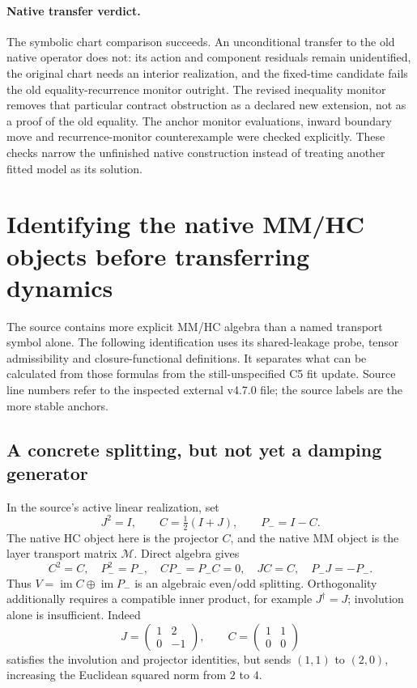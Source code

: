 \documentclass[11pt,a4paper]{article}
\begin{document}
\paragraph{Native transfer verdict.}
The symbolic chart comparison succeeds. An unconditional transfer to the
old native operator does not: its action and component residuals remain
unidentified, the original chart needs an interior realization, and the
fixed-time candidate fails the old equality-recurrence monitor outright.
The revised inequality monitor removes that particular contract obstruction
as a declared new extension, not as a proof of the old equality.
The anchor monitor evaluations, inward boundary move and recurrence-monitor
counterexample were checked explicitly. These checks narrow the unfinished
native construction instead of treating another fitted model as its solution.

\section{Identifying the native MM/HC objects before transferring dynamics}
\label{sec:native-mmhc-identification}
The source contains more explicit MM/HC algebra than a named transport
symbol alone. The following identification uses its shared-leakage probe,
tensor admissibility and closure-functional definitions. It separates what
can be calculated from those formulas from the still-unspecified C5 fit
update. Source line numbers refer to the inspected external v4.7.0 file;
the source labels are the more stable anchors.

\subsection{A concrete splitting, but not yet a damping generator}
In the source's active linear realization, set
\[
 J^2=I,\qquad C=\tfrac12(I+J),\qquad P_-=I-C.
\]
The native HC object here is the projector $C$, and the native MM object
is the layer transport matrix $\mathcal M$. Direct algebra gives
\[
 C^2=C,\quad P_-^2=P_-,\quad CP_-=P_-C=0,
 \quad JC=C,\quad P_-J=-P_-.
\]
Thus $V=\operatorname{im}C\oplus\operatorname{im}P_-$ is an algebraic
even/odd splitting. Orthogonality additionally requires a compatible
inner product, for example $J^\dagger=J$; involution alone is insufficient.
Indeed
\[
 J=\begin{pmatrix}1&2\\0&-1\end{pmatrix},\qquad
 C=\begin{pmatrix}1&1\\0&0\end{pmatrix}
\]
satisfies the involution and projector identities, but sends $(1,1)$ to
$(2,0)$, increasing the Euclidean squared norm from $2$ to $4$.
\end{document}
